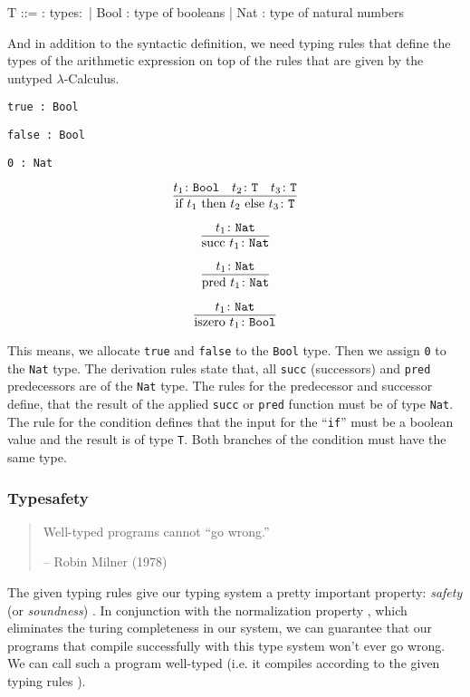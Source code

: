 \begin{bnfgrammar}
    T ::= : types$\colon$
    | Bool : type of booleans
    | Nat : type of natural numbers
\end{bnfgrammar}

And in addition to the syntactic definition, we need typing rules
that define the types of the arithmetic expression on top of
the rules that are given by the untyped $\lambda$-Calculus.

\begin{center}
    \texttt{true : Bool}
    
    \texttt{false : Bool}
    
    \texttt{0 : Nat}
\end{center}

\[\infer{ \text{if } t_1 \text{ then } t_2 \text{ else } t_3 \colon \texttt{T} }{ t_1 \colon \texttt{Bool} & t_2 \colon \texttt{T} & t_3 \colon \texttt{T} }\]

\[\infer{ \text{succ } t_1 \colon \texttt{Nat} }{ t_1 \colon \texttt{Nat} }\]

\[\infer{ \text{pred } t_1 \colon \texttt{Nat} }{ t_1 \colon \texttt{Nat} }\]

\[\infer{ \text{iszero } t_1 \colon \texttt{Bool} }{ t_1 \colon \texttt{Nat} }\]

This means, we allocate \texttt{true} and \texttt{false} to the \texttt{Bool} type.
Then we assign \texttt{0} to the \texttt{Nat} type. 
The derivation rules state that, all \texttt{succ} (successors) and \texttt{pred} predecessors are of the
\texttt{Nat} type. The rules for the predecessor and successor define, that the result
of the applied \texttt{succ} or \texttt{pred} function must be of type \texttt{Nat}. The rule for the condition
defines that the input for the ``\texttt{if}'' must be a boolean value and the result is
of type \texttt{T}. Both branches of the condition must have the same type.

\subsubsection{Typesafety}

\begin{quotation}
    Well-typed programs cannot ``go wrong.''
    \begin{flushright}
        -- Robin Milner (1978)
    \end{flushright}
\end{quotation}

The given typing rules give our typing system a pretty important property:
\textit{safety} (or \textit{soundness}) \cite{pierce2002ProgLang}.
In conjunction with the normalization property \cite{pierce2002ProgLang} \cite{baader_nipkow_1998},
which eliminates the turing completeness in our system, we can guarantee that our programs
that compile successfully with this type system won't ever go wrong. We can call
such a program well-typed (i.e. it compiles according to the given typing rules \cite{cardelliTypeSystems}).

